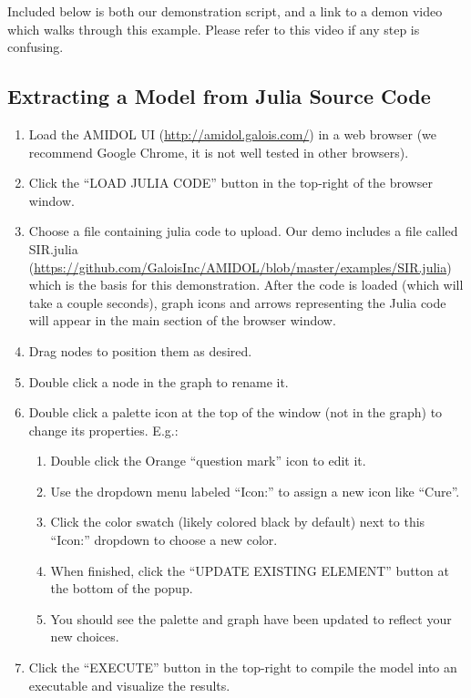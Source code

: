 \documentclass[12pt]{galois-whitepaper}
\begin{document}
Included below is both our demonstration script, and a link to a demon
video which walks through this example.  Please refer to this video if any step is confusing.

\subsection{Extracting a Model from Julia Source Code}

\begin{enumerate}
\item Load the AMIDOL UI (\url{http://amidol.galois.com/}) in a web browser (we recommend Google Chrome,
  it is not well tested in other browsers).
\item Click the “LOAD JULIA CODE” button in the top-right of the browser window.
\item Choose a file containing julia code to upload. Our demo includes a file called
SIR.julia
(\url{https://github.com/GaloisInc/AMIDOL/blob/master/examples/SIR.julia})
which is the basis for this demonstration. After the code is 
loaded (which will take a couple seconds), graph icons and arrows
representing the Julia code will appear in the main section of the
browser window.
\item Drag nodes to position them as desired.
\item Double click a node in the graph to rename it.
\item Double click a palette icon at the top of the window (not in the
  graph) to change its properties. E.g.:
  \begin{enumerate}
  \item Double click the Orange “question mark” icon to edit it.
  \item Use the dropdown menu labeled “Icon:” to assign a new icon like “Cure”.
  \item Click the color swatch (likely colored black by default) next to this “Icon:” dropdown to choose a new color.
  \item When finished, click the “UPDATE EXISTING ELEMENT” button at the bottom of the popup.
  \item You should see the palette and graph have been updated to reflect
  your new choices.
  \end{enumerate}
\item Click the “EXECUTE” button in the top-right to compile the model
  into an executable and visualize the results.
\end{enumerate}
\end{document}
